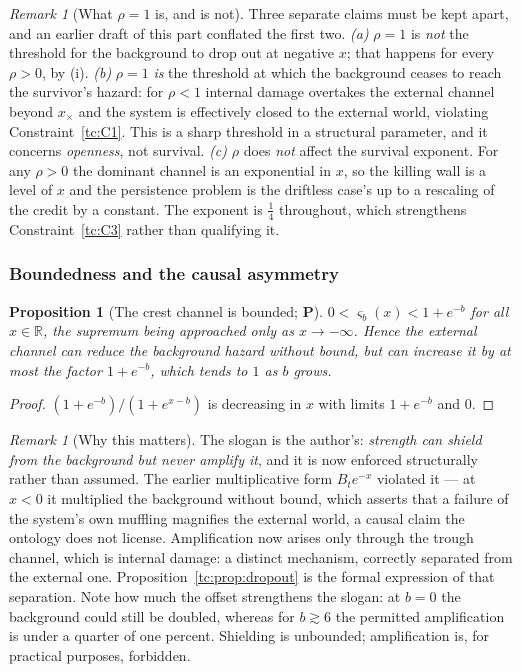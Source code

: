 \documentclass[11pt]{article}
\numberwithin{equation}{section}
\theoremstyle{plain}
\newtheorem{proposition}[theorem]{Proposition}
\theoremstyle{definition}
\theoremstyle{remark}
\newtheorem{remark}[theorem]{Remark}
\newcommand{\R}{\mathbb{R}}
\begin{document}
\begin{remark}[What $\rho=1$ is, and is not]\label{tc:rem:rhorole}
Three separate claims must be kept apart, and an earlier draft of this part conflated the first two.
\emph{(a)} $\rho=1$ is \emph{not} the threshold for the background to
drop out at negative $x$; that happens for every $\rho>0$, by
(i).
\emph{(b)} $\rho=1$ \emph{is} the threshold at which the background
ceases to reach the survivor's hazard: for $\rho<1$ internal damage
overtakes the external channel beyond $x_{\times}$ and the system is
effectively closed to the external world, violating
Constraint~\ref{tc:C1}. This is a sharp threshold in a structural
parameter, and it concerns \emph{openness}, not survival.
\emph{(c)} $\rho$ does \emph{not} affect the survival exponent. For any
$\rho>0$ the dominant channel is an exponential in $x$, so the killing
wall is a level of $x$ and the persistence problem is the driftless case's up
to a rescaling of the credit by a constant. The exponent is $\tfrac14$
throughout, which strengthens Constraint~\ref{tc:C3} rather than
qualifying it.
\end{remark}

\subsubsection{Boundedness and the causal asymmetry}
\label{tc:subsub:asymmetry}

\begin{proposition}[The crest channel is bounded; \textbf{P}]
\label{tc:prop:bounded}
$0<\varsigma_b(x)<1+e^{-b}$ for all $x\in\R$, the supremum being
approached only as $x\to-\infty$. Hence the external channel can
\emph{reduce} the background hazard without bound, but can
\emph{increase} it by at most the factor $1+e^{-b}$, which tends to $1$
as $b$ grows.
\end{proposition}

\begin{proof}
$(1+e^{-b})/(1+e^{x-b})$ is decreasing in $x$ with limits $1+e^{-b}$ and
$0$.
\end{proof}

\begin{remark}[Why this matters]\label{tc:rem:asymmetry}
The slogan is the author's: \emph{strength can shield from the
background but never amplify it}, and it is now enforced structurally
rather than assumed. The earlier multiplicative form $B_te^{-x}$
violated it --- at $x<0$ it multiplied the background without bound,
which asserts that a failure of the system's own muffling magnifies the
external world, a causal claim the ontology does not license.
Amplification now arises only through the trough channel, which is
internal damage: a distinct mechanism, correctly separated from the
external one. Proposition~\ref{tc:prop:dropout} is the formal expression
of that separation. Note how much the offset strengthens the slogan: at
$b=0$ the background could still be doubled, whereas for $b\gtrsim6$ the
permitted amplification is under a quarter of one percent. Shielding is
unbounded; amplification is, for practical purposes, forbidden.
\end{remark}
\end{document}
